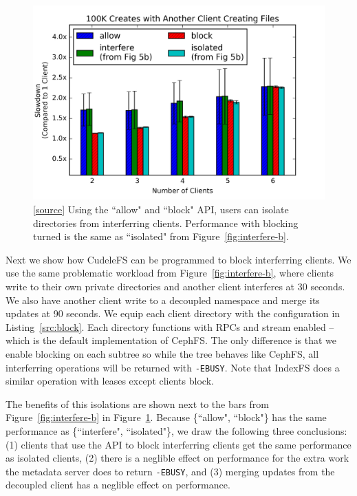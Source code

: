 \begin{figure}[tb]
\centering
\includegraphics[width=1.0\linewidth]{graphs/slowdown-allow-block.png}
\caption{
[\href{https://github.com/michaelsevilla/cudele-popper/blob/master/viz-blockallow.ipynb}{source}]
Using the ``allow" and ``block" API, users can isolate directories from
interferring clients. Performance with blocking turned is the same as
``isolated" from Figure~\ref{fig:interfere-b}.
\label{fig:slowdown-allow-block}}
\end{figure}

Next we show how CudeleFS can be programmed to block interferring clients. We
use the same problematic workload from Figure~\ref{fig:interfere-b}, where
clients write to their own private directories and another client interferes at
30 seconds.  We also have another client write to a decoupled namespace and
merge its updates at 90 seconds.  We equip each client directory with the
configuration in Listing~\ref{src:block}.  Each directory functions with RPCs
and stream enabled -- which is the default implementation of CephFS. The only
difference is that we enable blocking on each subtree so while the tree behaves
like CephFS, all interferring operations will be returned with \texttt{-EBUSY}.
Note that IndexFS does a similar operation with leases except clients block.

The benefits of this isolations are shown next to the bars from
Figure~\ref{fig:interfere-b} in Figure~\ref{fig:slowdown-allow-block}. Because
\{``allow", ``block"\} has the same performance as \{``interfere",
``isolated"\}, we draw the following three conclusions: (1) clients that use the
API to block interferring clients  get the same performance as isolated
clients, (2) there is a neglible effect on performance for the extra work the
metadata server does to return \texttt{-EBUSY}, and (3) merging updates from
the decoupled client has a neglible effect on performance.\\

